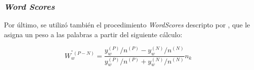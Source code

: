 \subsubsection{\textit{Word Scores}}
Por último, se utilizó también el procedimiento \textit{WordScores} descripto por
\cite{laver2003extracting}, que le asigna un peso a las palabras a partir
del siguiente cálculo:

\begin{equation*}
    W_{w}^{^*(P-N)} = \frac{y_{w}^{(P)}/n^{(P)}-y_{w}^{(N)}/n^{(N)}}{y_{w}^{(P)}/n^{(P)}+y_{w}^{(N)}/n^{(N)}}n_{k}
\end{equation*}
